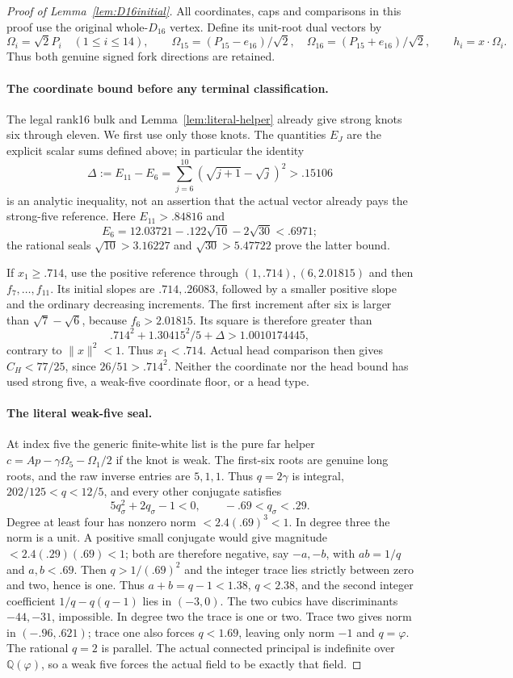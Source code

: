 \documentclass[11pt]{article}
\begin{document}
\begin{proof}[Proof of Lemma~\ref{lem:D16initial}]
All coordinates, caps and comparisons in this proof use the original
whole-$D_{16}$ vertex. Define its unit-root dual vectors by
\[
 \Omega_i=\sqrt2P_i\quad(1\le i\le14),\qquad
 \Omega_{15}=(P_{15}-e_{16})/\sqrt2,\quad
 \Omega_{16}=(P_{15}+e_{16})/\sqrt2,
 \qquad h_i=x\cdot\Omega_i.
\]
Thus both genuine signed fork directions are retained.

\paragraph{The coordinate bound before any terminal classification.}
The legal rank16 bulk and Lemma~\ref{lem:literal-helper} already
give strong knots six through eleven. We first use only those knots.
The quantities $E_J$ are the explicit scalar sums defined above;
in particular the identity
\[
 \Delta:=E_{11}-E_6
   =\sum_{j=6}^{10}(\sqrt{j+1}-\sqrt j)^2>.15106
\]
is an analytic inequality, not an assertion that the actual vector
already pays the strong-five reference.
Here $E_{11}>.84816$ and
\[
 E_6=12.03721-.122\sqrt{10}-2\sqrt{30}<.6971;
\]
the rational seals $\sqrt{10}>3.16227$ and $\sqrt{30}>5.47722$
prove the latter bound.

If $x_1\ge.714$, use the positive reference through
$(1,.714),(6,2.01815)$ and then $f_7,\ldots,f_{11}$.
Its initial slopes are $.714,.26083$, followed by a smaller
positive slope and the ordinary decreasing increments. The first
increment after six is larger than $\sqrt7-\sqrt6$, because
$f_6>2.01815$. Its square is therefore greater than
\[
 .714^2+1.30415^2/5+\Delta>1.0010174445,
\]
contrary to $\|x\|^2<1$. Thus $x_1<.714$.
Actual head comparison then gives $C_H<77/25$, since
$26/51>.714^2$. Neither the coordinate nor the head bound has
used strong five, a weak-five coordinate floor, or a head type.

\paragraph{The literal weak-five seal.}
At index five the generic finite-white list is the pure far helper
$c=Ap-\gamma\Omega_5-\Omega_1/2$ if the knot is weak.
The first-six roots are genuine long roots, and the raw inverse
entries are $5,1,1$. Thus $q=2\gamma$ is integral,
$202/125<q<12/5$, and every other conjugate satisfies
\[
 5q_\sigma^2+2q_\sigma-1<0,\qquad -.69<q_\sigma<.29.
\]
Degree at least four has nonzero norm $<2.4(.69)^3<1$.
In degree three the norm is a unit. A positive small conjugate would
give magnitude $<2.4(.29)(.69)<1$; both are therefore negative,
say $-a,-b$, with $ab=1/q$ and $a,b<.69$.
Then $q>1/(.69)^2$ and the integer trace lies strictly between
zero and two, hence is one. Thus $a+b=q-1<1.38$, $q<2.38$,
and the second integer coefficient $1/q-q(q-1)$ lies in $(-3,0)$.
The two cubics have discriminants $-44,-31$, impossible.
In degree two the trace is one or two. Trace two gives norm in
$(-.96,.621)$; trace one also forces $q<1.69$, leaving only norm
$-1$ and $q=\varphi$. The rational $q=2$ is parallel.
The actual connected principal is indefinite over
$\mathbb Q(\varphi)$, so a weak five forces the actual field to be
exactly that field.


\end{proof}
\end{document}
